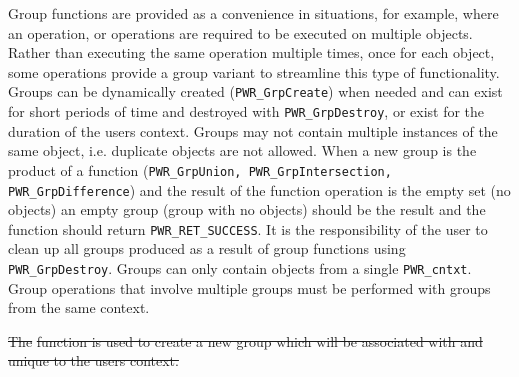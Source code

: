 \documentclass[12pt]{report} %
\providecommand{\DIFdeltex}[1]{{\protect\color{red}\sout{#1}}}                      %
\providecommand{\DIFdelbegin}{} %
\providecommand{\DIFdel}[1]{\texorpdfstring{\DIFdeltex{#1}}{}} %
\newcommand{\DIFscaledelfig}{0.5}
\newlength{\DIFdelgraphicswidth} %
\newlength{\DIFdelgraphicsheight} %
\newcommand{\DIFdelincludegraphics}[2][]{%
\sbox{\DIFdelgraphicsbox}{\DIFOincludegraphics[#1]{#2}}%
\settoboxwidth{\DIFdelgraphicswidth}{\DIFdelgraphicsbox} %
\settoboxtotalheight{\DIFdelgraphicsheight}{\DIFdelgraphicsbox} %
\scalebox{\DIFscaledelfig}{%
\parbox[b]{\DIFdelgraphicswidth}{\usebox{\DIFdelgraphicsbox}\\[-\baselineskip] \rule{\DIFdelgraphicswidth}{0em}}\llap{\resizebox{\DIFdelgraphicswidth}{\DIFdelgraphicsheight}{%
\setlength{\unitlength}{\DIFdelgraphicswidth}%
\begin{picture}(1,1)%
\thicklines\linethickness{2pt} %
{\color[rgb]{1,0,0}\put(0,0){\framebox(1,1){}}}%
{\color[rgb]{1,0,0}\put(0,0){\line( 1,1){1}}}%
{\color[rgb]{1,0,0}\put(0,1){\line(1,-1){1}}}%
\end{picture}%
}\hspace*{3pt}}} %
} %
\DeclareRobustCommand{\DIFdelbegin}{\DIFOdelbegin \let\includegraphics\DIFdelincludegraphics} %
\begin{document}
Group functions are provided as a convenience in situations, for example, where an operation, or operations are required to be executed on multiple objects. 
Rather than executing the same operation multiple times, once for each object, some operations provide a group variant to streamline this type of functionality.
Groups can be dynamically created (\texttt{PWR_GrpCreate}) when needed and can exist for short periods of time and destroyed with \texttt{PWR_GrpDestroy}, or exist for the duration of the users context.
Groups may not contain multiple instances of the same object, i.e. duplicate objects are not allowed.
When a new group is the product of a function (\texttt{PWR_GrpUnion, PWR_GrpIntersection, PWR_GrpDifference}) and the result of the function operation is the empty set (no objects) an empty group (group with no objects)  should be the result and the function should return \texttt{PWR_RET_SUCCESS}. 
It is the responsibility of the user to clean up all groups produced as a result of group functions using \texttt{PWR_GrpDestroy}.
Groups can only contain objects from a single \texttt{PWR_cntxt}.
Group operations that involve multiple groups must be performed with groups from the same context.

\DIFdelbegin %

\DIFdel{The }%
\DIFdel{function is used to create a new group which will be associated with and unique to the users context.
}%


\end{document}
